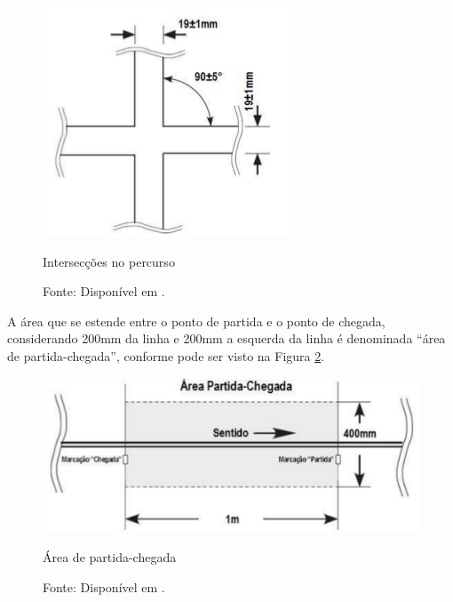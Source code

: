 \begin{figure}[h!]
 \centering
 \captionsetup{width=0.37\textwidth,font=footnotesize,textfont=bf}
 \includegraphics[scale=0.6]{figuras/Percurso1.png}
 \caption{Intersecções no percurso \label{fig:percurso1}}
 \vspace{-0.7cm}
 \caption*{Fonte: Disponível em \cite[p.4]{RegrasRobocore}.}
\end{figure}






A área que se estende entre o ponto de partida e o ponto de chegada, considerando 200mm da linha e 200mm a esquerda da linha
 é denominada ``área de partida-chegada'', conforme pode ser visto na Figura \ref{fig:percurso2}.\par

\vspace{0.6cm}
\begin{figure}[h!]
 \centering
 \captionsetup{width=0.55\textwidth,font=footnotesize,textfont=bf}
 \includegraphics[scale=0.5]{figuras/Percurso2.png}
 \caption{Área de partida-chegada \label{fig:percurso2}}
  \vspace{-0.3cm}
 \caption*{Fonte: Disponível em \cite[p.4]{RegrasRobocore}.}
\end{figure}



